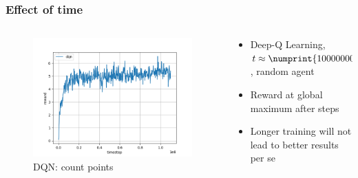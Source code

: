 \begin{frame}
\frametitle{Effect of time}

\begin{columns}[c]

\begin{column}{.5\textwidth}
\begin{figure}
\includegraphics[width=\textwidth]{dqn_custom-payoff_result_long-run.png}
\caption{DQN: count points}
\end{figure}
\end{column}

\begin{column}{.5\textwidth}
\begin{itemize}
\item Deep-Q Learning, $t \approx \numprint{100000000}$, random agent
\item Reward at global maximum after  steps
\item Longer training will not lead to better results per se
\end{itemize}
\end{column}

\end{columns}

\end{frame}


